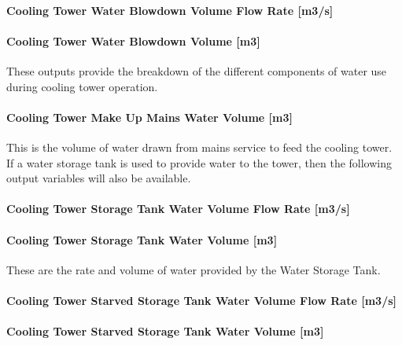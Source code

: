 \paragraph{Cooling Tower Water Blowdown Volume Flow Rate {[}m3/s{]}}\label{cooling-tower-water-blowdown-volume-flow-rate-m3s-2}

\paragraph{Cooling Tower Water Blowdown Volume {[}m3{]}}\label{cooling-tower-water-blowdown-volume-m3-2}

These outputs provide the breakdown of the different components of water use during cooling tower operation.

\paragraph{Cooling Tower Make Up Mains Water Volume {[}m3{]}}\label{cooling-tower-make-up-mains-water-volume-m3-2}

This is the volume of water drawn from mains service to feed the cooling tower. If a water storage tank is used to provide water to the tower, then the following output variables will also be available.

\paragraph{Cooling Tower Storage Tank Water Volume Flow Rate {[}m3/s{]}}\label{cooling-tower-storage-tank-water-volume-flow-rate-m3s-2}

\paragraph{Cooling Tower Storage Tank Water Volume {[}m3{]}}\label{cooling-tower-storage-tank-water-volume-m3-2}

These are the rate and volume of water provided by the Water Storage Tank.

\paragraph{Cooling Tower Starved Storage Tank Water Volume Flow Rate {[}m3/s{]}}\label{cooling-tower-starved-storage-tank-water-volume-flow-rate-m3s-2}

\paragraph{Cooling Tower Starved Storage Tank Water Volume {[}m3{]}}\label{cooling-tower-starved-storage-tank-water-volume-m3-2}

